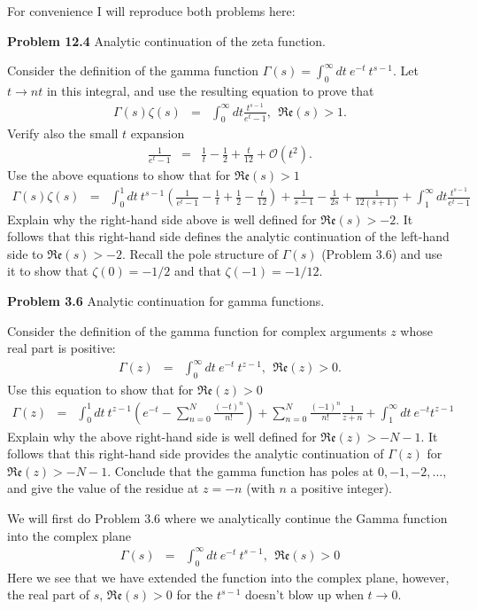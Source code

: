 \documentclass[aps,preprint,preprintnumbers,nofootinbib,showpacs,prd]{revtex4-1}
\newcommand{\nbea}{\begin{eqnarray*}}
\newcommand{\neea}{\end{eqnarray*}}
\begin{document}
For convenience I will reproduce both problems here:

{\bf Problem 12.4} Analytic continuation of the zeta function.

Consider the definition of the gamma function $\Gamma(s) = \int_0^\infty dt ~e^{-t}~t^{s-1}$. Let $t \rightarrow nt$ in this integral, and use the resulting equation to prove that
%
\nbea
\Gamma(s)\zeta(s) & = & \int_0^\infty dt \frac{t^{s-1}}{e^t - 1}, ~~\mathfrak{Re}(s) > 1.
\neea
%
Verify also the small $t$ expansion
%
\nbea
\frac{1}{e^t-1} & = & \frac{1}{t} - \frac{1}{2} + \frac{t}{12} + \mathcal{O}(t^2).
\neea
%
Use the above equations to show that for $\mathfrak{Re}(s) > 1$
%
\nbea
\Gamma(s)\zeta(s) & = & \int_0^1 dt~t^{s-1} \left ( \frac{1}{e^t - 1} -\frac{1}{t} + \frac{1}{2} - \frac{t}{12}\right ) + \frac{1}{s-1} - \frac{1}{2s} + \frac{1}{12(s+1)} + \int_1^\infty dt \frac{t^{s-1}}{e^t - 1}
\neea
%
Explain why the right-hand side above is well defined for $\mathfrak{Re}(s) > -2$. It follows that this right-hand side defines the analytic continuation of the left-hand side to $\mathfrak{Re}(s) > -2$. Recall the pole structure of $\Gamma(s)$ (Problem 3.6) and use it to show that $\zeta(0) = -1/2$ and that $\zeta(-1) = -1/12$.

{\bf Problem 3.6} Analytic continuation for gamma functions.

Consider the definition of the gamma function for complex arguments $z$ whose real part is positive:
%
\nbea
\Gamma(z) & = & \int_0^\infty dt~e^{-t}~t^{z-1}, ~~ \mathfrak{Re}(z) > 0.
\neea
%
Use this equation to show that for $\mathfrak{Re}(z) > 0$
%
\nbea
\Gamma(z) & = & \int_0^1 dt ~t^{z-1} \left ( e^{-t} - \sum_{n=0}^N \frac{(-t)^n}{n!} \right ) + \sum_{n=0}^N \frac{(-1)^n}{n!} \frac{1}{z+n} + \int_1^\infty dt~e^{-t} t^{z-1}
\neea
%
Explain why the above right-hand side is well defined for $\mathfrak{Re}(z) > -N-1$. It follows that this right-hand side provides the analytic continuation of $\Gamma(z)$ for $\mathfrak{Re}(z) > -N-1$. Conclude that the gamma function has poles at $0, -1, -2, ... ,$ and give the value of the residue at $z = -n$ (with $n$ a positive integer).

We will first do Problem 3.6 where we analytically continue the Gamma function into the complex plane
%
\nbea
\Gamma(s) & = & \int_0^\infty dt ~ e^{-t}~t^{s-1}, ~~ \mathfrak{Re}(s) > 0
\neea
%
Here we see that we have extended the function into the complex plane, however, the real part of $s$, $\mathfrak{Re}(s) > 0$ for the $t^{s-1}$ doesn't blow up when $t \rightarrow 0$.
\end{document}
